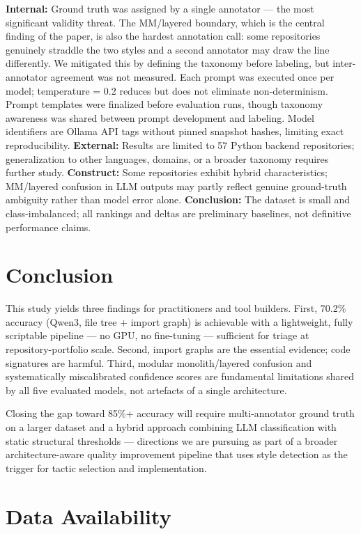 \documentclass[runningheads]{llncs}
\begin{document}
\textbf{Internal:} Ground truth was assigned by a single annotator --- the most significant validity threat. The MM/layered boundary, which is the central finding of the paper, is also the hardest annotation call: some repositories genuinely straddle the two styles and a second annotator may draw the line differently. We mitigated this by defining the taxonomy before labeling, but inter-annotator agreement was not measured. Each prompt was executed once per model; temperature = 0.2 reduces but does not eliminate non-determinism. Prompt templates were finalized before evaluation runs, though taxonomy awareness was shared between prompt development and labeling. Model identifiers are Ollama API tags without pinned snapshot hashes, limiting exact reproducibility. \textbf{External:} Results are limited to 57 Python backend repositories; generalization to other languages, domains, or a broader taxonomy requires further study. \textbf{Construct:} Some repositories exhibit hybrid characteristics; MM/layered confusion in LLM outputs may partly reflect genuine ground-truth ambiguity rather than model error alone. \textbf{Conclusion:} The dataset is small and class-imbalanced; all rankings and deltas are preliminary baselines, not definitive performance claims.

\section{Conclusion}
\label{sec:conclusion}

This study yields three findings for practitioners and tool builders. First, 70.2\% accuracy (Qwen3, file tree + import graph) is achievable with a lightweight, fully scriptable pipeline --- no GPU, no fine-tuning --- sufficient for triage at repository-portfolio scale. Second, import graphs are the essential evidence; code signatures are harmful. Third, modular monolith/layered confusion and systematically miscalibrated confidence scores are fundamental limitations shared by all five evaluated models, not artefacts of a single architecture.

Closing the gap toward 85\%+ accuracy will require multi-annotator ground truth on a larger dataset and a hybrid approach combining LLM classification with static structural thresholds --- directions we are pursuing as part of a broader architecture-aware quality improvement pipeline that uses style detection as the trigger for tactic selection and implementation.

\section*{Data Availability}
\end{document}
